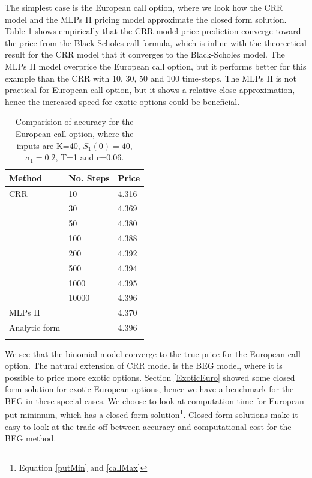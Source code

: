 The simplest case is the European call option, where we look how the CRR model and the MLPs II pricing model approximate the closed form solution. Table \ref{tab:EuroCall} shows empirically that the CRR model price prediction converge toward the price from the Black-Scholes call formula, which is inline with the theorectical result for the CRR model that it converges to the Black-Scholes model. The MLPs II model overprice the European call option, but it performs better for this example than the CRR with 10, 30, 50 and 100 time-steps. The MLPs II is not practical for European call option, but it shows a relative close approximation, hence the increased speed for exotic options could be beneficial.\\

\begin{table}[th]
\caption{Comparision of accuracy for the European call option, where the inputs are K=40, $S_1(0)=40$, $\sigma_1=0.2$, T=1 and r=0.06.}
\label{tab:EuroCall}
\centering
\begin{tabular}{l l l}
\toprule
\textbf{Method} & \textbf{No. Steps} & \textbf{Price} \\
\midrule
CRR & 10 & 4.316\\
& 30 & 4.369\\
& 50 & 	4.380\\
& 100 & 4.388\\
& 200 & 4.392\\
& 500 & 4.394\\
& 1000 & 4.395\\
& 10000 & 4.396\\
MLPs II & & 4.370\\
Analytic form & & 4.396\\
\bottomrule\\
\end{tabular}
\end{table}

We see that the binomial model converge to the true price for the European call option. The natural extension of CRR model is the BEG model, where it is possible to price more exotic options. Section \ref{ExoticEuro} showed some closed form solution for exotic European options, hence we have a benchmark for the BEG in these special cases. We choose to look at computation time for European put minimum, which has a closed form solution\footnote{Equation \eqref{putMin} and \eqref{callMax}}. Closed form solutions make it easy to look at the trade-off between accuracy and computational cost for the BEG method. \\

